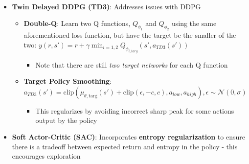 \documentclass[twocolumn]{article}
\providecommand{\tightlist}{%
  \setlength{\itemsep}{\GlobalItemSep}\setlength{\parskip}{\GlobalListParSkip}}
\newlength{\GlobalItemSep}
\newlength{\GlobalListParSkip}
\DeclareMathOperator*{\argmax}{arg\,max}
\begin{document}
\begin{itemize}
  \begin{itemize}
  \tightlist
  \item
    \(a^* = \argmax_a Q^* (s, a) \approx \argmax_\theta Q_\phi (s, \mu_\theta(s))\)

    \begin{itemize}
    \tightlist
    \item
      Train policy \(\mu_\theta(s)\) to give action that maximizes
      \(Q_\phi(s,a)\)
    \end{itemize}
  \item
    \textbf{Q-Function Update}:
    \(\min \mathbb{E}_{s, r, s', d \sim \mathcal{D}}[(r + \gamma Q_{\phi_{\text{targ}}}(s', \mu_{\theta_{\text{targ}}}(s')) - Q_\phi (s,a))^2]\)
  \item
    \textbf{Policy Update}:
    \(\max_\theta \mathbb{E}_{s \sim \mathcal{D}}[Q_\phi (s, \mu_\theta(s))]\)
  \item
    \textbf{Disadvantage}: Tends to \emph{dramatically overestimate
    Q-values}
  \end{itemize}
\item
  \textbf{Twin Delayed DDPG (TD3)}: Addresses issues with DDPG

  \begin{itemize}
  \tightlist
  \item
    \textbf{Double-Q}: Learn two Q functions, \(Q_{\phi_1}\) and
    \(Q_{\phi_2}\) using the same aforementioned loss function, but have
    the target be the smaller of the two:
    \(y(r, s') = r + \gamma \min_{i=1,2} Q_{\phi_{i, targ}} (s', a_{TD3}(s'))\)

    \begin{itemize}
    \tightlist
    \item
      Note that there are still \emph{two target networks} for each Q
      function
    \end{itemize}
  \item
    \textbf{Target Policy Smoothing}:
    \(a_{TD3}(s') = \text{clip}(\mu_{\theta, \text{targ}}(s') + \text{clip}(\epsilon, -c, c), a_{low}, a_{high}), \epsilon \sim \mathcal{N}(0, \sigma)\)

    \begin{itemize}
    \tightlist
    \item
      This regularizes by avoiding incorrect sharp peak for some actions
      output by the policy
    \end{itemize}
  \end{itemize}
\item
  \textbf{Soft Actor-Critic (SAC)}: Incorporates \textbf{entropy
  regularization} to ensure there is a tradeoff between expected return
  and entropy in the policy - this encourages exploration


\end{itemize}
\end{document}
